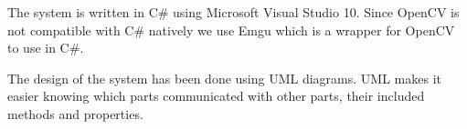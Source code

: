 The system is written in C\# using Microsoft Visual Studio 10. Since OpenCV\cite{opencv} is not compatible with C\# natively we use Emgu\cite{emgu} which is a wrapper for OpenCV to use in C\#. 

The design of the system has been done using UML diagrams. UML makes it easier knowing which parts communicated with other parts, their included methods and properties.

